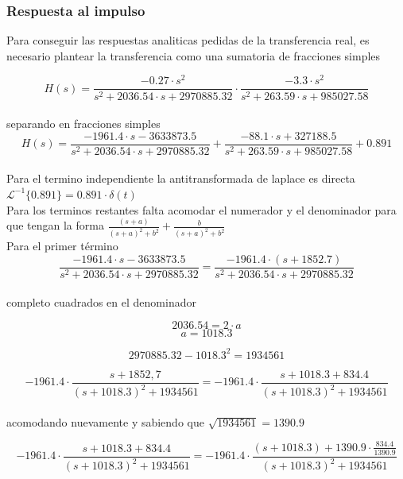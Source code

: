 \documentclass[10pt,a4paper]{article}
\begin{document}
    \subsubsection{Respuesta al impulso}
    Para conseguir las respuestas analiticas pedidas de la transferencia real, es necesario plantear la transferencia como una sumatoria de fracciones simples


    \[H(s)=\frac{-0.27 \cdot s^{2}}{s^{2}+2036.54 \cdot s + 2970885.32} \cdot \frac{-3.3 \cdot s^{2}}{s^{2}+263.59 \cdot s + 985027.58}\] \\


    separando en fracciones simples
    \[H(s)=\frac{-1961.4 \cdot s -3633873.5}{s^{2}+2036.54 \cdot s + 2970885.32} + \frac{-88.1 \cdot s + 327188.5}{s^{2}+263.59 \cdot s + 985027.58} + 0.891\] \\


    Para el termino independiente la antitransformada de laplace es directa \\

    $\mathscr{L}^{-1}\{0.891\}=0.891 \cdot \delta(t)$ \\

    Para los terminos restantes falta acomodar el numerador y el denominador para que tengan la forma $\frac{(s+a)}{(s+a)^2+b^2} +\frac{b}{(s+a)^2+b^2}$ \\




    Para el primer término \\


    \[\frac{-1961.4 \cdot s -3633873.5}{s^{2}+2036.54 \cdot s + 2970885.32} = \frac{-1961.4 \cdot (s + 1852.7)}{s^{2}+2036.54 \cdot s + 2970885.32}\] \\


    completo cuadrados en el denominador

    \[2036.54 = 2\cdot a\]
    \[a = 1018.3\]

    \[2970885.32-1018.3^2 = 1934561\]


    \[-1961.4\cdot \frac{s + 1852,7}{{(s + 1018.3)^{2}}+1934561} = -1961.4\cdot\frac{s +1018.3 +834.4}{{(s+1018.3)^{2}}+1934561}\] \\

    acomodando nuevamente y sabiendo que $\sqrt{1934561} = 1390.9$


    \[-1961.4\cdot\frac{s +1018.3 +834.4}{{(s+1018.3)^{2}}+1934561} = -1961.4\cdot \frac{(s +1018.3) + 1390.9\cdot \frac{834.4}{1390.9}}{{(s+1018.3)^{2}}+1934561}\] \\
\end{document}
